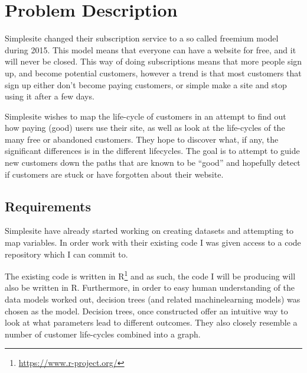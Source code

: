\section{Problem Description}

Simplesite changed their subscription service to a so called freemium model
during 2015. This model means that everyone can have a website for free, and it
will never be closed. This way of doing subscriptions means that more people
sign up, and become potential customers, however a trend is that most customers
that sign up either don't become paying customers, or simple make a site and
stop using it after a few days.

Simplesite wishes to map the life-cycle of customers in an attempt to find out
how paying (good) users use their site, as well as look at the life-cycles of
the many free or abandoned customers. They hope to discover what, if any, the
significant differences is in the different lifecycles. The goal is to attempt
to guide new customers down the paths that are known to be ``good'' and hopefully
detect if customers are stuck or have forgotten about their website.

\subsection{Requirements}
Simplesite have already started working on creating datasets and attempting to
map variables. In order work with their existing code I was given access to a
code repository which I can commit to.

The existing code is written in R\footnote{\url{https://www.r-project.org/}} and
as such, the code I will be producing will also be written in R. Furthermore, in
order to easy human understanding of the data models worked out, decision trees
(and related machinelearning models) was chosen as the model. Decision trees,
once constructed offer an intuitive way to look at what parameters lead to
different outcomes. They also closely resemble a number of customer life-cycles
combined into a graph.
